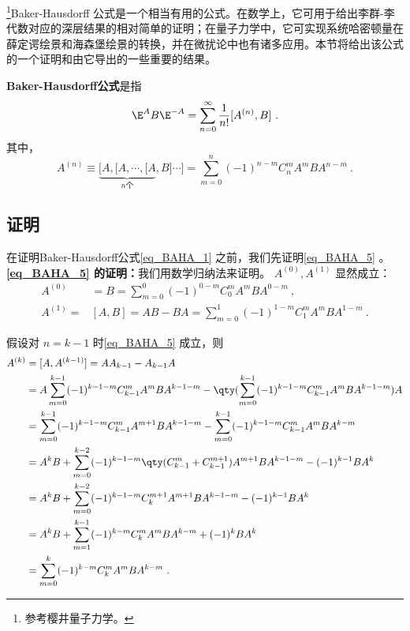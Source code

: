 \begin{issues}
\end{issues}


\footnote{参考樱井量子力学\cite{Sakurai}。}Baker-Hausdorff 公式是一个相当有用的公式。在数学上，它可用于给出李群-李代数对应的深层结果的相对简单的证明；在量子力学中，它可实现系统哈密顿量在薛定谔绘景和海森堡绘景的转换，并在微扰论中也有诸多应用。本节将给出该公式的一个证明和由它导出的一些重要的结果。

\textbf{Baker-Hausdorff公式}是指
\begin{equation}\label{eq_BAHA_1}
\E ^{A}B\E^{-A}=\sum_{n=0}^{\infty}\frac{1}{n!}[A^{(n)},B]~.
\end{equation}
其中，
\begin{equation}\label{eq_BAHA_5}
A^{(n)}\equiv\underbrace{[A,[A,\cdots,[A}_{n\text{个}},B]\cdots]
=\sum_{m=0}^{n}(-1)^{n-m}C_{n}^{m}A^mBA^{n-m}~.
\end{equation}

\subsection{证明}
在证明Baker-Hausdorff公式\autoref{eq_BAHA_1} 之前，我们先证明\autoref{eq_BAHA_5} 。\\

\textbf{\autoref{eq_BAHA_5} 的证明：}我们用数学归纳法来证明。
$A^{(0)},A^{(1)}$ 显然成立：
\begin{equation}
\begin{aligned}
A^{(0)}&=B=\sum_{m=0}^{0}(-1)^{0-m}C_{0}^{m}A^mBA^{0-m}~,\\
A^{(1)}=&[A,B]=AB-BA=\sum_{m=0}^{1}(-1)^{1-m}C_{1}^{m}A^mBA^{1-m}~.
\end{aligned}
\end{equation}

假设对 $n=k-1$ 时\autoref{eq_BAHA_5} 成立，则
\begin{equation}
\begin{aligned}
A^{(k)}&=[A,A^{(k-1)}]=AA_{k-1}-A_{k-1}A\\
&=A\sum_{m=0}^{k-1}(-1)^{k-1-m}C_{k-1}^{m}A^mBA^{k-1-m}-\qty(\sum_{m=0}^{k-1}(-1)^{k-1-m}C_{k-1}^{m}A^mBA^{k-1-m})A\\
&=\sum_{m=0}^{k-1}(-1)^{k-1-m}C_{k-1}^{m}A^{m+1}BA^{k-1-m}-\sum_{m=0}^{k-1}(-1)^{k-1-m}C_{k-1}^{m}A^mBA^{k-m}\\
&=A^{k}B+\sum_{m=0}^{k-2}(-1)^{k-1-m}\qty(C_{k-1}^{m}+C_{k-1}^{m+1})A^{m+1}BA^{k-1-m}-(-1)^{k-1}BA^k\\
&=A^{k}B+\sum_{m=0}^{k-2}(-1)^{k-1-m}C_{k}^{m+1}A^{m+1}BA^{k-1-m}-(-1)^{k-1}BA^k\\
&=A^{k}B+\sum_{m=1}^{k-1}(-1)^{k-m}C_{k}^{m}A^{m}BA^{k-m}+(-1)^{k}BA^k\\
&=\sum_{m=0}^{k}(-1)^{k-m}C_{k}^{m}A^{m}BA^{k-m}~.
\end{aligned}
\end{equation}

